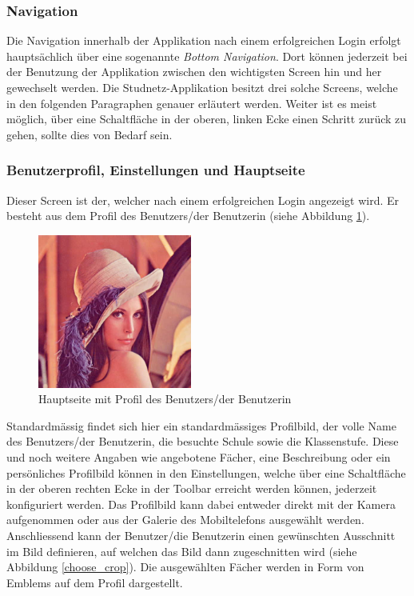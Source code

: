 \documentclass[../main.tex]{subfiles}
\begin{document}
\subsubsection*{Navigation}
Die Navigation innerhalb der Applikation nach einem erfolgreichen Login erfolgt hauptsächlich über eine sogenannte \emph{Bottom Navigation}. Dort können jederzeit bei der Benutzung der Applikation zwischen den wichtigsten Screen hin und her gewechselt werden. Die Studnetz-Applikation besitzt drei solche Screens, welche in den folgenden Paragraphen genauer erläutert werden. Weiter ist es meist möglich, über eine Schaltfläche in der oberen, linken Ecke einen Schritt zurück zu gehen, sollte dies von Bedarf sein.

\subsubsection*{Benutzerprofil, Einstellungen und Hauptseite} 
Dieser Screen ist der, welcher nach einem erfolgreichen Login angezeigt wird. Er besteht aus dem Profil des Benutzers/der Benutzerin (siehe Abbildung \ref{mainpage}). 
\begin{figure} 
	\centering
	\includegraphics[width=0.45\textwidth, height=0.45\textwidth/9*16]{./images/lena.jpg}
	\caption{Hauptseite mit Profil des Benutzers/der Benutzerin}
	\label{mainpage}
\end{figure}
Standardmässig findet sich hier ein standardmässiges Profilbild, der volle Name des Benutzers/der Benutzerin, die besuchte Schule sowie die Klassenstufe. Diese und noch weitere Angaben wie angebotene Fächer, eine Beschreibung oder ein persönliches Profilbild können in den Einstellungen, welche über eine Schaltfläche in der oberen rechten Ecke in der Toolbar erreicht werden können, jederzeit konfiguriert werden. Das Profilbild kann dabei entweder direkt mit der Kamera aufgenommen oder aus der Galerie des Mobiltelefons ausgewählt werden. Anschliessend kann der Benutzer/die Benutzerin einen gewünschten Ausschnitt im Bild definieren, auf welchen das Bild dann zugeschnitten wird (siehe Abbildung \ref{choose_crop}). Die ausgewählten Fächer werden in Form von Emblems auf dem Profil dargestellt.
\end{document}
